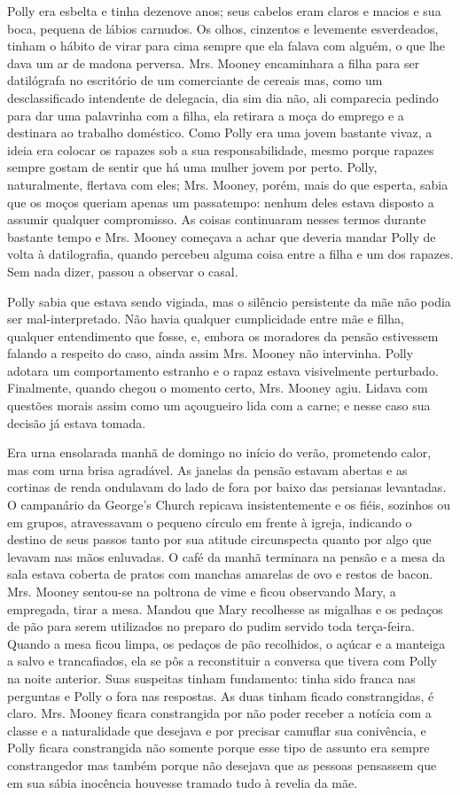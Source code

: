 Polly era esbelta e tinha dezenove anos; seus cabelos eram claros e
macios e sua boca, pequena de lábios carnudos. Os olhos, cinzentos e
levemente esverdeados, tinham o hábito de virar para cima sempre que
ela falava com alguém, o que lhe dava um ar de madona perversa. Mrs.
Mooney encaminhara a filha para ser datilógrafa no escritório de um
comerciante de cereais mas, como um desclassificado intendente de
delegacia, dia sim dia não, ali comparecia pedindo para dar uma
palavrinha com
a filha, ela retirara a moça do emprego e a destinara ao trabalho
doméstico. Como Polly era uma jovem bastante vivaz, a ideia era
colocar os rapazes sob a sua responsabilidade, mesmo porque rapazes
sempre gostam de sentir que há uma mulher jovem por perto. Polly,
naturalmente, flertava com eles; Mrs. Mooney, porém, mais do que
esperta, sabia que os moços queriam apenas um passatempo: nenhum deles
estava disposto a assumir qualquer compromisso. As coisas continuaram
nesses termos durante bastante tempo e Mrs. Mooney começava a achar
que deveria mandar Polly de volta à datilografia, quando percebeu
alguma coisa entre a filha e um dos rapazes. Sem nada dizer, passou a
observar o casal.

Polly sabia que estava sendo vigiada, mas o silêncio persistente da
mãe não podia ser mal-interpretado. Não havia qualquer cumplicidade
entre mãe e filha, qualquer entendimento que fosse, e, embora os
moradores da pensão estivessem falando a respeito do caso, ainda assim
Mrs. Mooney não intervinha. Polly adotara um comportamento estranho e
o rapaz estava visivelmente perturbado. Finalmente, quando chegou o
momento certo, Mrs. Mooney agiu. Lidava com questões morais assim como
um açougueiro lida com a carne; e nesse caso sua decisão já estava
tomada.

Era urna ensolarada manhã de domingo no início do verão, prometendo
calor, mas com urna brisa agradável. As janelas da pensão estavam
abertas e as cortinas de renda ondulavam do lado de fora por baixo das
persianas levantadas. O campanário da George's Church repicava
insistentemente e os fiéis, sozinhos ou em grupos, atravessavam o
pequeno círculo em frente à igreja, indicando o destino de seus passos
tanto por sua atitude circunspecta quanto por algo que levavam nas
mãos enluvadas. O café da manhã terminara na pensão e a mesa da sala
estava coberta de pratos com manchas amarelas de ovo e restos de
bacon. Mrs. Mooney sentou-se na poltrona de vime e ficou observando
Mary, a empregada, tirar a mesa. Mandou que Mary recolhesse as
migalhas e os pedaços de pão para serem utilizados no preparo do
pudim servido toda terça-feira. Quando a mesa ficou limpa, os pedaços
de pão recolhidos, o açúcar e a manteiga a salvo e trancafiados, ela
se pôs a reconstituir a conversa que tivera com
Polly na noite anterior. Suas suspeitas tinham fundamento: tinha sido
franca nas perguntas e Polly o fora nas respostas. As duas tinham
ficado constrangidas, é claro. Mrs. Mooney ficara constrangida por
não poder receber a notícia com a classe e a naturalidade que
desejava e por precisar camuflar sua conivência, e Polly ficara
constrangida não somente porque esse tipo de assunto era sempre
constrangedor mas também porque não desejava que as pessoas pensassem
que em sua sábia inocência houvesse tramado tudo à revelia da mãe.

